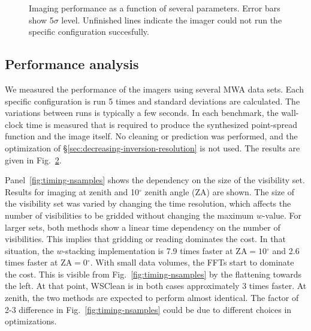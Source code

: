 \documentclass[useAMS,usenatbib]{mn2e}
\newcommand{\degree}{\ensuremath{^{\circ}}\xspace}
\begin{document}
\begin{figure}
\begin{subfigure}{.5\linewidth}
\caption{}\label{fig:timing-fov}%
\end{subfigure}%
\caption{Imaging performance as a function of several parameters. Error bars show 5$\sigma$ level. Unfinished lines indicate the imager could not run the specific configuration succesfully.}\label{fig:timings}
\end{figure}

\subsection{Performance analysis}

We measured the performance of the imagers using several MWA data sets. Each specific configuration is run 5 times and standard deviations are calculated. The variations between runs is typically a few seconds. In each benchmark, the wall-clock time is measured that is required to produce the synthesized point-spread function and the image itself. No cleaning or prediction was performed, and the optimization of \S\ref{sec:decreasing-inversion-resolution} is not used. The results are given in Fig.~\ref{fig:timings}.

Panel~\ref{fig:timing-nsamples} shows the dependency on the size of the visibility set. Results for imaging at zenith and 10\degree zenith angle (ZA) are shown. The size of the visibility set was varied by changing the time resolution, which affects the number of visibilities to be gridded without changing the maximum $w$-value. For larger sets, both methods show a linear time dependency on the number of visibilities. This implies that gridding or reading dominates the cost. In that situation, the $w$-stacking implementation is 7.9 times faster at $\textrm{ZA}=10\degree$ and 2.6 times faster at $\textrm{ZA}=0\degree$. With small data volumes, the FFTs start to dominate the cost. This is visible from Fig.~\ref{fig:timing-nsamples} by the flattening towards the left. At that point, WSClean is in both cases approximately 3 times faster. At zenith, the two methods are expected to perform almost identical. The factor of 2-3 difference in Fig.~\ref{fig:timing-nsamples} could be due to different choices in optimizations.
\end{document}
